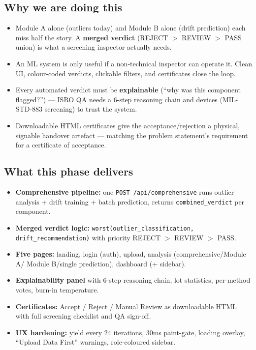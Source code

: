 \documentclass[11pt,a4paper]{article}
\newcommand{\code}[1]{\texttt{\small #1}}
\begin{document}
\subsection*{Why we are doing this}
\begin{itemize}[leftmargin=1.5em]
  \item Module A alone (outliers today) and Module B alone (drift prediction) each miss half the
        story. A \textbf{merged verdict} (REJECT $>$ REVIEW $>$ PASS union) is what a screening
        inspector actually needs.
  \item An ML system is only useful if a non-technical inspector can operate it. Clean UI,
        colour-coded verdicts, clickable filters, and certificates close the loop.
  \item Every automated verdict must be \textbf{explainable} (``why was this component flagged?'')
        --- ISRO QA needs a 6-step reasoning chain and devices (MIL-STD-883 screening) to
        trust the system.
  \item Downloadable HTML certificates give the acceptance/rejection a physical, signable
        handover artefact --- matching the problem statement's requirement for a certificate of
        acceptance.
\end{itemize}

\subsection*{What this phase delivers}
\begin{itemize}[leftmargin=1.5em]
  \item \textbf{Comprehensive pipeline:} one \code{POST /api/comprehensive} runs outlier analysis
        + drift training + batch prediction, returns \code{combined\_verdict} per component.
  \item \textbf{Merged verdict logic:} \code{worst(outlier\_classification, drift\_recommendation)}
        with priority REJECT $>$ REVIEW $>$ PASS.
  \item \textbf{Five pages:} landing, login (auth), upload, analysis (comprehensive/Module A/
        Module B/single prediction), dashboard ($+$ sidebar).
  \item \textbf{Explainability panel} with 6-step reasoning chain, lot statistics,
        per-method votes, burn-in temperature.
  \item \textbf{Certificates:} Accept / Reject / Manual Review as downloadable HTML with full
        screening checklist and QA sign-off.
  \item \textbf{UX hardening:} yield every 24 iterations, 30ms paint-gate, loading overlay,
        ``Upload Data First'' warnings, role-coloured sidebar.
\end{itemize}
\end{document}
